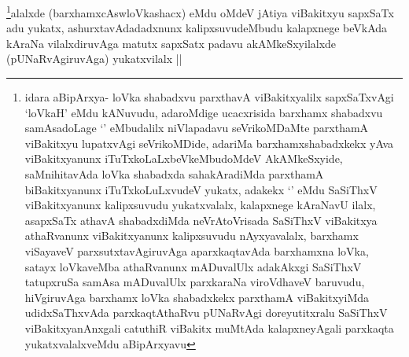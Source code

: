 \begin{artha}
\footnote[1]{idara aBipArxya- loVka shabadxvu parxthavA
  viBakitxyalilx sapxSaTxvAgi `loVkaH' eMdu kANuvudu, adaroMdige
  ucacxrisida barxhamx shabadxvu samAsadoLage `\stext' eMbudalilx
  niVlapadavu seVrikoMDaMte parxthamA viBakitxyu lupatxvAgi
  seVrikoMDide, adariMa barxhamxshabadxkekx yAva viBakitxyanunx
  iTuTxkoLaLxbeVkeMbudoMdeV AkAMkeSxyide, saMnihitavAda loVka
  shabadxda sahakAradiMda parxthamA biBakitxyanunx iTuTxkoLuLxvudeV
  yukatx, adakekx `\stext' eMdu SaSiThxV viBakitxyanunx kalipxsuvudu
  yukatxvalalx, kalapxnege kAraNavU ilalx, asapxSaTx athavA
  shabadxdiMda neVrAtoVrisada SaSiThxV viBakitxya athaRvanunx
  viBakitxyanunx kalipxsuvudu nAyxyavalalx, barxhamx viSayaveV
  parxsutxtavAgiruvAga aparxkaqtavAda barxhamxna loVka, satayx
  loVkaveMba athaRvanunx mADuvalUlx adakAkxgi SaSiThxV tatupxruSa
  samAsa mADuvalUlx parxkaraNa viroVdhaveV baruvudu, hiVgiruvAga
  barxhamx loVka shabadxkekx parxthamA viBakitxyiMda udidxSaThxvAda
  parxkaqtAthaRvu pUNaRvAgi doreyutitxralu SaSiThxV viBakitxyanAnxgali
catuthiR viBakitx muMtAda kalapxneyAgali parxkaqta yukatxvalalxveMdu aBipArxyavu}alalxde (barxhamxcAswloVkashacx) eMdu oMdeV jAtiya
viBakitxyu sapxSaTx adu yukatx, ashurxtavAdadadxnunx kalipxsuvudeMbudu
kalapxnege beVkAda kAraNa vilalxdiruvAga matutx sapxSatx padavu
akAMkeSxyilalxde (pUNaRvAgiruvAga) yukatxvilalx ||
\end{artha}

